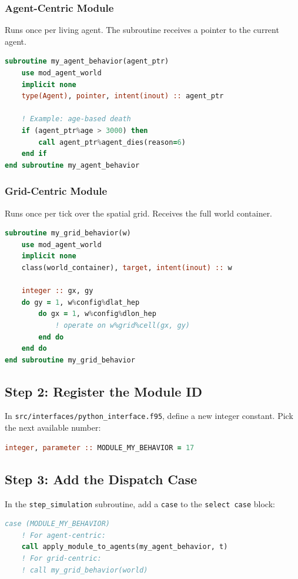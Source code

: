\subsubsection*{Agent-Centric Module}
Runs once per living agent. The subroutine receives a pointer to the current agent.
\begin{lstlisting}[language=Fortran]
subroutine my_agent_behavior(agent_ptr)
    use mod_agent_world
    implicit none
    type(Agent), pointer, intent(inout) :: agent_ptr
    
    ! Example: age-based death
    if (agent_ptr%age > 3000) then
        call agent_ptr%agent_dies(reason=6)
    end if
end subroutine my_agent_behavior
\end{lstlisting}

\subsubsection*{Grid-Centric Module}
Runs once per tick over the spatial grid. Receives the full world container.
\begin{lstlisting}[language=Fortran]
subroutine my_grid_behavior(w)
    use mod_agent_world
    implicit none
    class(world_container), target, intent(inout) :: w

    integer :: gx, gy
    do gy = 1, w%config%dlat_hep
        do gx = 1, w%config%dlon_hep
            ! operate on w%grid%cell(gx, gy)
        end do
    end do
end subroutine my_grid_behavior
\end{lstlisting}

\subsection{Step 2: Register the Module ID}
In \texttt{src/interfaces/python\_interface.f95}, define a new integer constant. Pick the next available number:
\begin{lstlisting}[language=Fortran]
integer, parameter :: MODULE_MY_BEHAVIOR = 17
\end{lstlisting}

\subsection{Step 3: Add the Dispatch Case}
In the \texttt{step\_simulation} subroutine, add a \texttt{case} to the \texttt{select case} block:
\begin{lstlisting}[language=Fortran]
case (MODULE_MY_BEHAVIOR)
    ! For agent-centric:
    call apply_module_to_agents(my_agent_behavior, t)
    ! For grid-centric:
    ! call my_grid_behavior(world)
\end{lstlisting}

